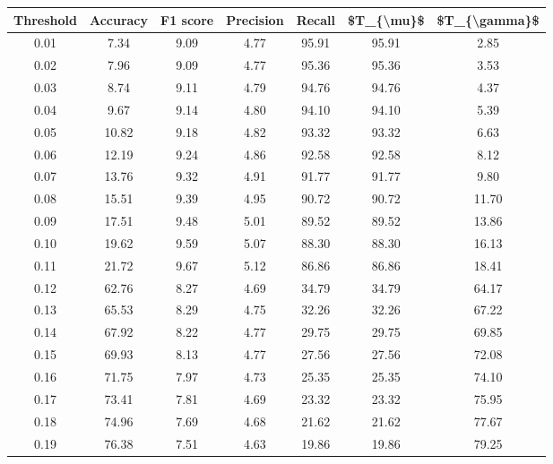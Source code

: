 \begin{tabular}{|c|c|c|c|c|c|c|}
\toprule
 Threshold &  Accuracy &  F1 score &  Precision &  Recall &  \$T\_\{\textbackslash mu\}\$ &  \$T\_\{\textbackslash gamma\}\$ \\
\hline
      0.01 &      7.34 &      9.09 &       4.77 &   95.91 &      95.91 &          2.85 \\
      0.02 &      7.96 &      9.09 &       4.77 &   95.36 &      95.36 &          3.53 \\
      0.03 &      8.74 &      9.11 &       4.79 &   94.76 &      94.76 &          4.37 \\
      0.04 &      9.67 &      9.14 &       4.80 &   94.10 &      94.10 &          5.39 \\
      0.05 &     10.82 &      9.18 &       4.82 &   93.32 &      93.32 &          6.63 \\
      0.06 &     12.19 &      9.24 &       4.86 &   92.58 &      92.58 &          8.12 \\
      0.07 &     13.76 &      9.32 &       4.91 &   91.77 &      91.77 &          9.80 \\
      0.08 &     15.51 &      9.39 &       4.95 &   90.72 &      90.72 &         11.70 \\
      0.09 &     17.51 &      9.48 &       5.01 &   89.52 &      89.52 &         13.86 \\
      0.10 &     19.62 &      9.59 &       5.07 &   88.30 &      88.30 &         16.13 \\
      0.11 &     21.72 &      9.67 &       5.12 &   86.86 &      86.86 &         18.41 \\
      0.12 &     62.76 &      8.27 &       4.69 &   34.79 &      34.79 &         64.17 \\
      0.13 &     65.53 &      8.29 &       4.75 &   32.26 &      32.26 &         67.22 \\
      0.14 &     67.92 &      8.22 &       4.77 &   29.75 &      29.75 &         69.85 \\
      0.15 &     69.93 &      8.13 &       4.77 &   27.56 &      27.56 &         72.08 \\
      0.16 &     71.75 &      7.97 &       4.73 &   25.35 &      25.35 &         74.10 \\
      0.17 &     73.41 &      7.81 &       4.69 &   23.32 &      23.32 &         75.95 \\
      0.18 &     74.96 &      7.69 &       4.68 &   21.62 &      21.62 &         77.67 \\
      0.19 &     76.38 &      7.51 &       4.63 &   19.86 &      19.86 &         79.25 \\

\end{tabular}
